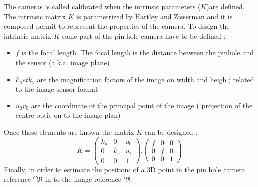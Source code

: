 
The cameras is called calibrated when the intrinsic parameters ($K$)are defined.  
 The intrinsic matrix $K$ is parametrized by Hartley and Zisserman and it is composed permit to represent the properties of the camera. To design the intrinsic matrix $K$ some part of the pin hole camera have to be defined :\\
  \begin{itemize}
  
 	\item $f$ is  the focal length. The focal length is the distance between the pinhole and the sensor (a.k.a. image plane)
  	\item $k_u et k_v$ are the magnification factors of the image on width and heigh ; related to the image sensor format%
  	\item $u_0 v_0$  are the coordinate  of  the principal point of the image ( projection of the centre optic on to the image plan)  %
  	  \end{itemize}
		Once these elements are known the matrix $K$ can be designed :
	\begin{equation}
		K=
		\begin{pmatrix}
			k_u 	& 0 	& u_0 \\
			0 		& k_v	& u_1\\
			0 		&	0	& 1
		\end{pmatrix} .
		\begin{pmatrix}
			f 		& 0 	& 0  \\
			0 		& f		& 0  \\
			0 		&	0	& 1  
		\end{pmatrix} 
	\label{eq:K}
	\end{equation}
Finally, in order to estimate the positions of a 3D point in the pin hole camera reference $^C\Re$ in to the image reference $^i\Re$ 

